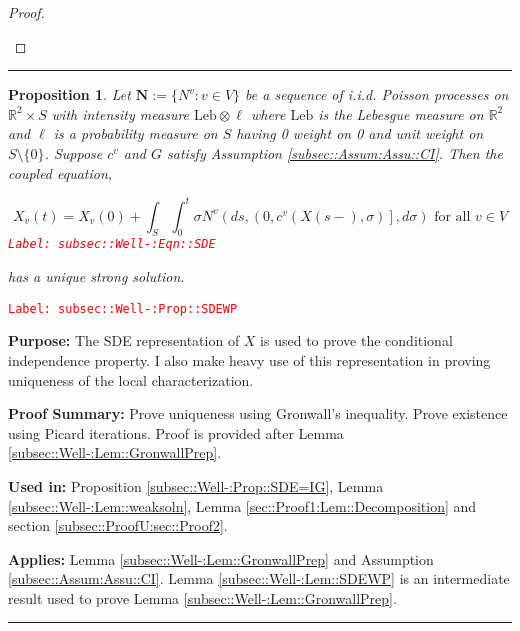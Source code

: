 \documentclass[12pt]{article}
\newcommand{\mb}{\mathbb}
\newcommand{\te}{\text}
\newcommand{\tr}{\textcolor{red}}
\newcommand{\labe}[1]{\tr{\texttt{Label: #1}}}
\newcommand{\purpose}{\textbf{Purpose: }}
\newcommand{\pfsum}{\textbf{Proof Summary: }}
\newcommand{\usein}{\textbf{Used in: }}
\newcommand{\app}{\textbf{Applies: }}
\newcommand{\lin}{\rule{\linewidth}{0.4 pt}}
\newcommand{\defeq}{:=}								%
\renewcommand{\v}{v}							%
\renewcommand{\S}{S}							%
\newcommand{\s}{\sigma}							%
\renewcommand{\t}{t}							%
\renewcommand{\tt}{s}							%
\newcommand{\X}{X}								%
\newcommand{\IGr}{c}							%
\newcommand{\vind}[1]{^{#1}}					%
\newcommand{\cind}[1]{_{#1}}					%
\newcommand{\tp}[1]{(#1)}						%
\newcommand{\poisses}{\mathbf{N}}				%
\newcommand{\poiss}{N}							%
\newcommand{\leb}{\te{Leb}}						%
\newcommand{\Sm}{\ell}							%
\newtheorem{prop}[thms]{Proposition}
\begin{document}
\begin{proof}
\begin{enumerate}[i)]
\end{enumerate}
\end{proof}

\lin

\begin{prop}
Let \(\poisses \defeq \{\poiss\vind{\v}:\v\in V\}\) be a sequence of i.i.d. Poisson processes on \(\mb{R}^2\times \S\) with intensity measure \(\leb\otimes \Sm\) where \(\leb\) is the Lebesgue measure on \(\mb{R}^2\) and \(\Sm\) is a probability measure on \(\S\) having 0 weight on 0 and unit weight on \(\S\setminus \{0\}\). Suppose \(\IGr\vind{\v}\) and \(G\) satisfy Assumption \ref{subsec::Assum:Assu::CI}. Then the coupled equation,

\begin{equation}
\X\cind{\v}\tp{\t} = \X\cind{\v}\tp{0} + \int_\S\int_0^\t \s\poiss\vind{\v}\left(d\tt,\left(0,\IGr\vind{\v}(\X\tp{\tt-},\s)\right],d\s\right) \te{ for all }\v \in V
\label{subsec::Well-:Eqn::SDE}
\end{equation}
\labe{subsec::Well-:Eqn::SDE}

has a unique strong solution.
\label{subsec::Well-:Prop::SDEWP}
\end{prop}
\labe{subsec::Well-:Prop::SDEWP}

\purpose The SDE representation of \(\X\) is used to prove the conditional independence property. I also make heavy use of this representation in proving uniqueness of the local characterization.

\pfsum Prove uniqueness using Gronwall's inequality. Prove existence using Picard iterations. Proof is provided after Lemma \ref{subsec::Well-:Lem::GronwallPrep}.

\usein Proposition \ref{subsec::Well-:Prop::SDE=IG}, Lemma \ref{subsec::Well-:Lem::weaksoln}, Lemma \ref{sec::Proof1:Lem::Decomposition} and section \ref{subsec::ProofU:sec::Proof2}.

\app Lemma \ref{subsec::Well-:Lem::GronwallPrep} and Assumption \ref{subsec::Assum:Assu::CI}. Lemma \ref{subsec::Well-:Lem::SDEWP} is an intermediate result used to prove Lemma \ref{subsec::Well-:Lem::GronwallPrep}.

\lin
\end{document}
